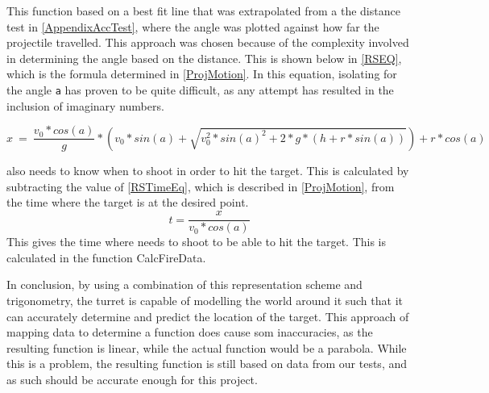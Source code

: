 This function based on a best fit line that was extrapolated from a the distance
test in \autoref{AppendixAccTest}, where the angle was plotted against how far
the projectile travelled. This approach was chosen because of the complexity
involved in determining the angle based on the distance. This is shown below in
\autoref{RSEQ}, which is the formula determined in \autoref{ProjMotion}. In this
equation, isolating for the angle \texttt{a} has proven to be quite difficult,
as any attempt has resulted in the inclusion of imaginary numbers.
  
\begin{equation}\label{RSEQ}
x\ =\ \frac{v_0*cos(a)}{g}* \left(
v_0*sin(a)+\sqrt{v_0^2*sin(a)^2+2*g*(h+r*sin(a))}\right)+r*cos(a)
\end{equation}

\name also needs to know when to shoot in order to hit the target.
This is calculated by subtracting the value of \autoref{RSTimeEq}, which is described in
\autoref{ProjMotion}, from the time where the target is at the desired point.
\begin{equation}\label{RSTimeEq}
t=\frac{x}{v_0*cos(a)}
\end{equation}
This gives the time where \name needs to shoot to be able to hit the target.
This is calculated in the function CalcFireData.\nl

In conclusion, by using a combination of this representation scheme and
trigonometry, the turret is capable of modelling the world around it such that
it can accurately determine and predict the location of the target. This
approach of mapping data to determine a function does cause som inaccuracies, as
the resulting function is linear, while the actual function would be a parabola.
While this is a problem, the resulting function is still based on data from our
tests, and as such should be accurate enough for this project.
